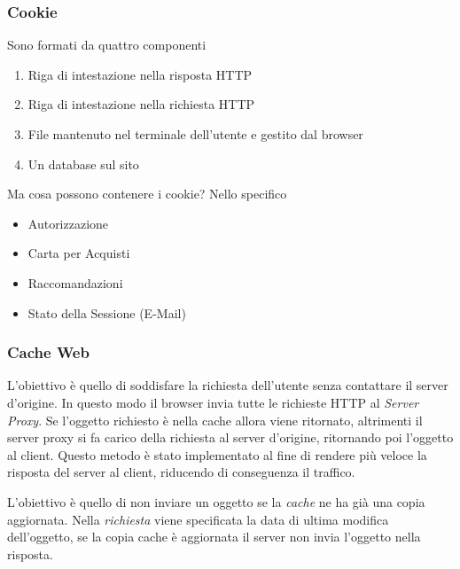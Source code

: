 \documentclass{article}
\newcounter{subsubsubsection}[subsubsection]
\begin{document}
            \subsubsection{Cookie}
                Sono formati da quattro componenti
                \begin{enumerate}
                    \item Riga di intestazione nella risposta HTTP
                    \item Riga di intestazione nella richiesta HTTP
                    \item File mantenuto nel terminale dell'utente e gestito dal browser
                    \item Un database sul sito
                \end{enumerate}
                Ma cosa possono contenere i cookie? Nello specifico
                \begin{itemize}
                    \item Autorizzazione
                    \item Carta per Acquisti
                    \item Raccomandazioni
                    \item Stato della Sessione (E-Mail)
                \end{itemize}

            \subsubsection{Cache Web}
                L'obiettivo è quello di soddisfare la richiesta dell'utente senza contattare il server d'origine. In questo modo il browser invia tutte le richieste HTTP al \textit{Server Proxy}. Se l'oggetto richiesto è nella cache allora viene ritornato, altrimenti il server proxy si fa carico della richiesta al server d'origine, ritornando poi l'oggetto al client.
                Questo metodo è stato implementato al fine di rendere più veloce la risposta del server al client, riducendo di conseguenza il traffico.

                    L'obiettivo è quello di non inviare un oggetto se la \textit{cache} ne ha già una copia aggiornata. Nella \textit{richiesta} viene specificata la data di ultima modifica dell'oggetto, se la copia cache è aggiornata il server non invia l'oggetto nella risposta.
                
\end{document}
